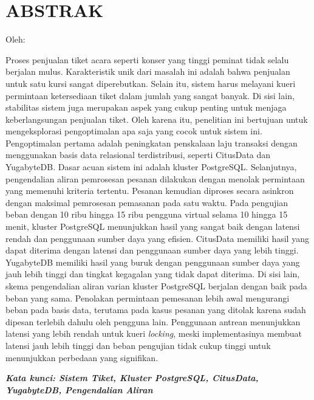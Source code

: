 \clearpage
\chapter*{ABSTRAK}
\begin{center}
  \center
  \begin{singlespace}
    \large\bfseries\MakeUppercase{\thetitle}

    \normalfont\normalsize
    Oleh:

    \bfseries \theauthor
  \end{singlespace}
\end{center}

\begin{singlespace}
  \small
  Proses penjualan tiket acara seperti konser yang tinggi peminat tidak selalu berjalan mulus. Karakteristik unik dari masalah ini adalah bahwa penjualan untuk satu kursi sangat diperebutkan. Selain itu, sistem harus melayani kueri permintaan ketersediaan tiket dalam jumlah yang sangat banyak. Di sisi lain, stabilitas sistem juga merupakan aspek yang cukup penting untuk menjaga keberlangsungan penjualan tiket. Oleh karena itu, penelitian ini bertujuan untuk mengeksplorasi pengoptimalan apa saja yang cocok untuk sistem ini. Pengoptimalan pertama adalah peningkatan penskalaan laju transaksi dengan menggunakan basis data relasional terdistribusi, seperti CitusData dan YugabyteDB. Dasar acuan sistem ini adalah kluster PostgreSQL. Selanjutnya, pengendalian aliran pemrosesan pesanan dilakukan dengan menolak permintaan yang memenuhi kriteria tertentu. Pesanan kemudian diproses secara asinkron dengan maksimal pemrosesan pemasanan pada satu waktu. Pada pengujian beban dengan 10 ribu hingga 15 ribu pengguna virtual selama 10 hingga 15 menit, kluster PostgreSQL menunjukkan hasil yang sangat baik dengan latensi rendah dan penggunaan sumber daya yang efisien. CitusData memiliki hasil yang dapat diterima dengan latensi dan penggunaan sumber daya yang lebih tinggi. YugabyteDB memiliki hasil yang buruk dengan penggunaan sumber daya yang jauh lebih tinggi dan tingkat kegagalan yang tidak dapat diterima. Di sisi lain, skema pengendalian aliran varian kluster PostgreSQL berjalan dengan baik pada beban yang sama. Penolakan permintaan pemesanan lebih awal mengurangi beban pada basis data, terutama pada kasus pesanan yang ditolak karena sudah dipesan terlebih dahulu oleh pengguna lain. Penggunaan antrean menunjukkan latensi yang lebih rendah untuk kueri \textit{locking}, meski implementasinya membuat latensi jauh lebih tinggi dan beban pengujian tidak cukup tinggi untuk menunjukkan perbedaan yang signifikan.

  \textbf{\textit{Kata kunci: Sistem Tiket, Kluster PostgreSQL, CitusData, YugabyteDB, Pengendalian Aliran}}

\end{singlespace}
\clearpage
